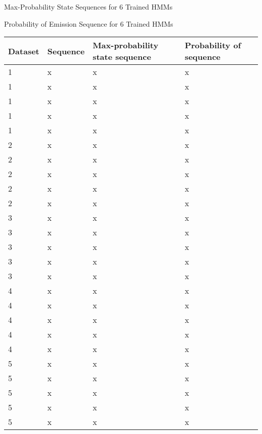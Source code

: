 \indent\problem[10] %
Max-Probability State Sequences for 6 Trained HMMs
\begin{subsolution}
	
\end{subsolution}
\clearpage

\indent\problem[17] %
Probability of Emission Sequence for 6 Trained HMMs

\begin{solution}
	
\begin{center}
  \begin{tabular}{ l | l |l | l }
Dataset & Sequence & Max-probability state sequence & Probability of sequence  \\ \hline
1 & x                       & x                     & x\\
1 & x                  & x                & x\\
1 & x             & x           & x\\
1 & x        & x      & x\\
1 & x   & x & x
 \\ \hline
2 & x                       & x                     & x\\
2 & x                  & x                & x\\
2 & x             & x           & x\\
2 & x        & x      & x\\
2 & x   & x & x
 \\ \hline
3 & x                       & x                     & x\\
3 & x                  & x                & x\\
3 & x             & x           & x\\
3 & x        & x      & x\\
3 & x   & x & x
 \\ \hline
4 & x                       & x                     & x\\
4 & x                  & x                & x\\
4 & x             & x           & x\\
4 & x        & x      & x\\
4 & x   & x & x
 \\ \hline
5 & x                       & x                     & x\\
5 & x                  & x                & x\\
5 & x             & x           & x\\
5 & x        & x      & x\\
5 & x   & x & x
 \\ \hline

  \end{tabular}
\end{center}
\end{solution}
\clearpage

